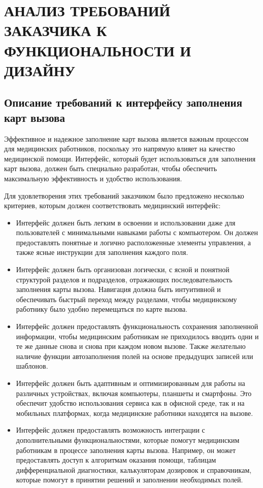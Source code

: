 \section{АНАЛИЗ ТРЕБОВАНИЙ ЗАКАЗЧИКА К ФУНКЦИОНАЛЬНОСТИ И ДИЗАЙНУ}

\subsection{Описание требований к интерфейсу заполнения карт вызова}

Эффективное и надежное заполнение карт вызова является важным процессом для медицинских работников, поскольку это напрямую влияет на качество медицинской помощи. Интерфейс, который будет использоваться для заполнения карт вызова, должен быть специально разработан, чтобы обеспечить максимальную эффективность и удобство использования.

Для удовлетворения этих требований заказчиком было предложено несколько критериев, которым должен соответствовать медицинский интерфейс:

\begin{itemize}
    \item Интерфейс должен быть легким в освоении и использовании даже для пользователей с минимальными навыками работы с компьютером. Он должен предоставлять понятные и логично расположенные элементы управления, а также ясные инструкции для заполнения каждого поля.
    \item Интерфейс должен быть организован логически, с ясной и понятной структурой разделов и подразделов, отражающих последовательность заполнения карты вызова. Навигация должна быть интуитивной и обеспечивать быстрый переход между разделами, чтобы медицинскому работнику было удобно перемещаться по карте вызова.
    \item Интерфейс должен предоставлять функциональность сохранения заполненной информации, чтобы медицинским работникам не приходилось вводить одни и те же данные снова и снова при каждом новом вызове. Также желательно наличие функции автозаполнения полей на основе предыдущих записей или шаблонов.
    \item Интерфейс должен быть адаптивным и оптимизированным для работы на различных устройствах, включая компьютеры, планшеты и смартфоны. Это обеспечит удобство использования сервиса как в офисной среде, так и на мобильных платформах, когда медицинские работники находятся на вызове.
    \item Интерфейс должен предоставлять возможность интеграции с дополнительными функциональностями, которые помогут медицинским работникам в процессе заполнения карты вызова. Например, он может предоставлять доступ к алгоритмам оказания помощи, таблицам дифференциальной диагностики, калькуляторам дозировок и справочникам, которые помогут в принятии решений и заполнении необходимых полей.
\end{itemize}

